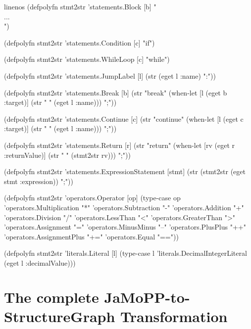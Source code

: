 \documentclass[submission]{eptcs}
\begin{document}
\begin{clojurecode*}{linenos}
(defpolyfn stmt2str 'statements.Block [b]
  "\\{...\\}")

(defpolyfn stmt2str 'statements.Condition [c]
  "if")

(defpolyfn stmt2str 'statements.WhileLoop [c]
  "while")

(defpolyfn stmt2str 'statements.JumpLabel [l]
  (str (eget l :name) ":"))

(defpolyfn stmt2str 'statements.Break [b]
  (str "break"
       (when-let [l (eget b :target)]
         (str " " (eget l :name)))
       ";"))

(defpolyfn stmt2str 'statements.Continue [c]
  (str "continue"
       (when-let [l (eget c :target)]
         (str " " (eget l :name)))
       ";"))

(defpolyfn stmt2str 'statements.Return [r]
  (str "return" (when-let [rv (eget r :returnValue)]
                  (str " " (stmt2str rv)))
       ";"))

(defpolyfn stmt2str 'statements.ExpressionStatement [stmt]
  (str (stmt2str (eget stmt :expression)) ";"))

(defpolyfn stmt2str 'operators.Operator [op]
  (type-case op
    'operators.Multiplication "*"
    'operators.Subtraction    "-"
    'operators.Addition       "+"
    'operators.Division       "/"
    'operators.LessThan       "<"
    'operators.GreaterThan    ">"
    'operators.Assignment     "="
    'operators.MinusMinus     "--"
    'operators.PlusPlus       "++"
    'operators.AssignmentPlus "+="
    'operators.Equal          "=="))

(defpolyfn stmt2str 'literals.Literal [l]
  (type-case l
    'literals.DecimalIntegerLiteral (eget l :decimalValue)))
\end{clojurecode*}

\section{The complete JaMoPP-to-StructureGraph Transformation}
\label{sec:compl-jamopp-struct}
\end{document}
